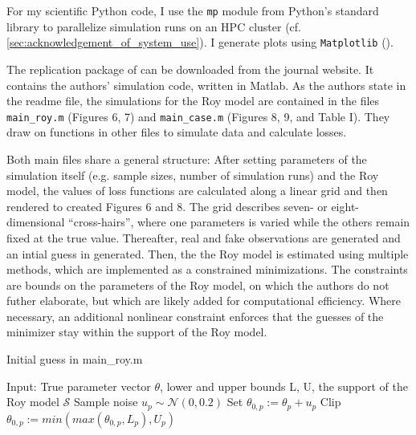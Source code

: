 For my scientific Python code, I use the \texttt{mp} module from Python's standard library to parallelize simulation runs on an HPC cluster (cf. \ref{sec:acknowledgement_of_system_use}).
I generate plots using \texttt{Matplotlib} (\cite{Matplotlib}).

The replication package of \cite{kaji2023adversarial} can be downloaded from the journal website.
It contains the authors' simulation code, written in Matlab. %
As the authors state in the readme file, the simulations for the Roy model are contained in the files \texttt{main\_roy.m} (Figures 6, 7) and \texttt{main\_case.m} (Figures 8, 9, and Table I).
They draw on functions in other files to simulate data and calculate losses.

Both main files share a general structure:
After setting parameters of the simulation itself (e.g. sample sizes, number of simulation runs) and the Roy model, the values of loss functions are calculated along a linear grid and then rendered to created Figures 6 and 8.
The grid describes seven- or eight-dimensional ``cross-hairs'', where one parameters is varied while the others remain fixed at the true value.
Thereafter, real and fake observations are generated and an intial guess in generated.
Then, the the Roy model is estimated using multiple methods, which are implemented as a constrained minimizations.%
The constraints are bounds on the parameters of the Roy model, on which the authors do not futher elaborate, but which are likely added for computational efficiency. %
Where necessary, an additional nonlinear constraint enforces that the guesses of the minimizer stay within the support of the Roy model.

\begin{algorithm}
    \caption{Initial guess in main\_roy.m}
    \label{alg:theta0}
    \begin{algorithmic}[1]
        \STATE Input: True parameter vector $\theta$, lower and upper bounds L, U, the support of the Roy model $\mathcal{S}$
            \STATE Sample noise $u_p \sim \mathcal{N}(0, 0.2)$
            \STATE Set $\theta_{0,p} := \theta_p + u_p$
            \STATE Clip $\theta_{0,p} := min(max(\theta_{0,p}, L_p), U_p)$
        \ENDWHILE
    \end{algorithmic}
\end{algorithm}

